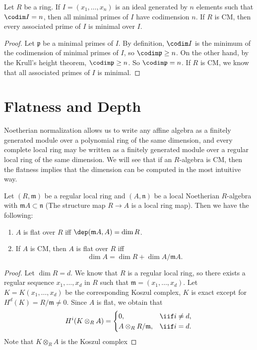 \begin{corollary}
  Let \(R\) be a ring. If \(I=(x_1,\ldots,x_n)\) is an ideal generated by \(n\) elements such that \(\codim I=n\), then all minimal primes of \(I\) have codimension \(n\). If \(R\) is CM, then every associated prime of \(I\) is minimal over \(I\). 
\end{corollary}

\begin{proof}
    Let \(\mathfrak{p}\) be a minimal primes of \(I\). By definition, \(\codim I\) is the minimum of the codimension of minimal primes of \(I\), so \(\codim \mathfrak{p}\geq n\). On the other hand, by the Krull's height theorem, \(\codim \mathfrak{p}\geq n\). So \(\codim \mathfrak{p}=n\). If \(R\) is CM, we know that all associated primes of \(I\) is minimal. 
\end{proof}

\section{Flatness and Depth}  

Noetherian normalization allows us to write any affine algebra as a finitely generated module over a polynomial ring of the same dimension, and every complete local ring may be written as a finitely generated module over a regular local ring of the same dimension. We will see that if an \(R\)-algebra is CM, then the flatness implies that the dimension can be computed in the most intuitive way. 

\begin{theorem}
  Let \((R,\mathfrak{m})\) be a regular local ring and \((A,\mathfrak{n})\) be a local Noetherian \(R\)-algebra with \(\mathfrak{m}A\subset \mathfrak{n}\) (The structure map \(R\rightarrow A\) is a local ring map). Then we have the following:
  \begin{enumerate}[(1)]
    \item \(A\) is flat over \(R\) iff \(\dep (\mathfrak{m}A,A)=\dim R\).
    \item If \(A\) is CM, then \(A\) is flat over \(R\) iff 
    \[\dim A=\dim R+\dim A/\mathfrak{m}A.\]
  \end{enumerate}
\end{theorem}

\begin{proof}
    Let \(\dim R=d\). We know that \(R\) is a regular local ring, so there exists a regular sequence \(x_1,\ldots,x_d\) in \(R\) such that \(\mathfrak{m}=(x_1,\ldots,x_d)\). Let \(K=K(x_1,\ldots,x_d)\) be the corresponding Koszul complex, \(K\) is exact except for \(H^d(K)=R/\mathfrak{m}\neq 0\). Since \(A\) is flat, we obtain that 
    \[H^i(K\otimes_R A)=\begin{cases}
      0,&\iif i\neq d,\\
      A\otimes_R R/\mathfrak{m},&\iif i=d.
    \end{cases}\] 
    Note that \(K\otimes_R A\) is the Koszul complex 
\end{proof}


